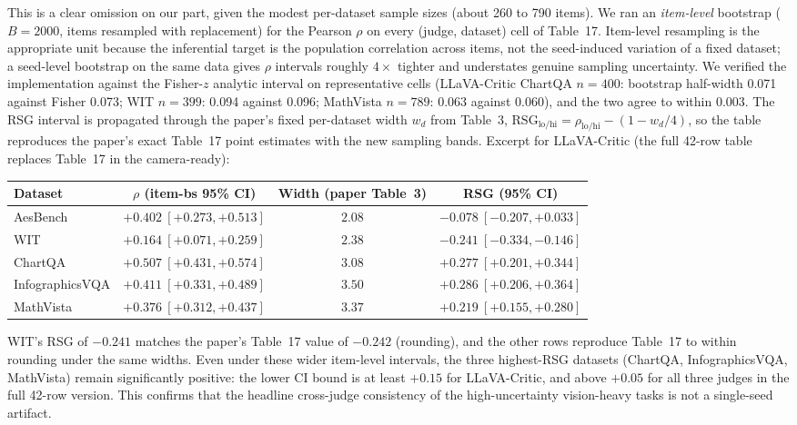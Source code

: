 \documentclass[11pt]{article}
\begin{document}
This is a clear omission on our part, given the modest per-dataset sample sizes (about 260 to 790 items). We ran an \emph{item-level} bootstrap ($B = 2000$, items resampled with replacement) for the Pearson $\rho$ on every (judge, dataset) cell of Table~17. Item-level resampling is the appropriate unit because the inferential target is the population correlation across items, not the seed-induced variation of a fixed dataset; a seed-level bootstrap on the same data gives $\rho$ intervals roughly $4\times$ tighter and understates genuine sampling uncertainty. We verified the implementation against the Fisher-$z$ analytic interval on representative cells (LLaVA-Critic ChartQA $n=400$: bootstrap half-width 0.071 against Fisher 0.073; WIT $n=399$: 0.094 against 0.096; MathVista $n=789$: 0.063 against 0.060), and the two agree to within 0.003. The RSG interval is propagated through the paper's fixed per-dataset width $w_d$ from Table~3, $\text{RSG}_{\text{lo/hi}} = \rho_{\text{lo/hi}} - (1 - w_d/4)$, so the table reproduces the paper's exact Table~17 point estimates with the new sampling bands. Excerpt for LLaVA-Critic (the full 42-row table replaces Table~17 in the camera-ready):

\begin{center}
\small
\begin{tabular}{lccc}
\toprule
\textbf{Dataset} & $\rho$ \textbf{(item-bs 95\% CI)} & \textbf{Width (paper Table~3)} & \textbf{RSG (95\% CI)} \\
\midrule
AesBench         & $+0.402\ [+0.273, +0.513]$ & $2.08$ & $-0.078\ [-0.207, +0.033]$ \\
WIT              & $+0.164\ [+0.071, +0.259]$ & $2.38$ & $-0.241\ [-0.334, -0.146]$ \\
ChartQA          & $+0.507\ [+0.431, +0.574]$ & $3.08$ & $+0.277\ [+0.201, +0.344]$ \\
InfographicsVQA  & $+0.411\ [+0.331, +0.489]$ & $3.50$ & $+0.286\ [+0.206, +0.364]$ \\
MathVista        & $+0.376\ [+0.312, +0.437]$ & $3.37$ & $+0.219\ [+0.155, +0.280]$ \\
\bottomrule
\end{tabular}
\end{center}

WIT's RSG of $-0.241$ matches the paper's Table~17 value of $-0.242$ (rounding), and the other rows reproduce Table~17 to within rounding under the same widths. Even under these wider item-level intervals, the three highest-RSG datasets (ChartQA, InfographicsVQA, MathVista) remain significantly positive: the lower CI bound is at least $+0.15$ for LLaVA-Critic, and above $+0.05$ for all three judges in the full 42-row version. This confirms that the headline cross-judge consistency of the high-uncertainty vision-heavy tasks is not a single-seed artifact.
\end{document}
